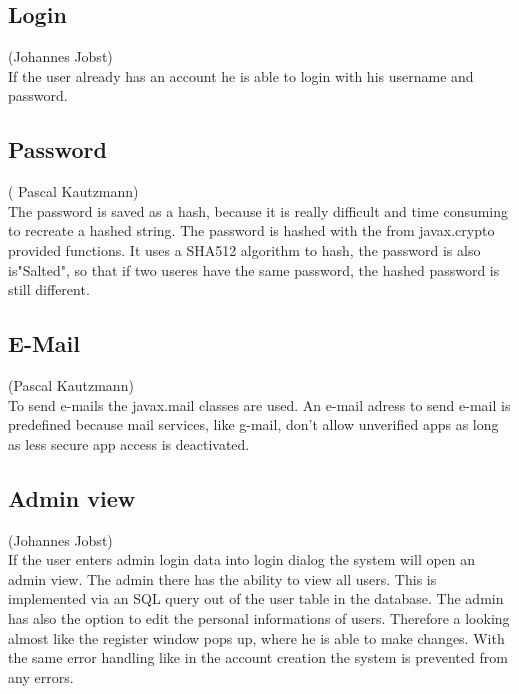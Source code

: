 \documentclass[a4paper, 12pt]{report}
\begin{document}
\subsection{Login}
{\tiny (Johannes Jobst)\\}
If the user already has an account he is able to login with his username and password.

\subsection{Password}
{\tiny ( Pascal Kautzmann)\\}
The password is saved as a hash, because it is really difficult and time consuming to recreate a hashed string.
The password is hashed with the from javax.crypto provided functions. It uses a SHA512 algorithm  to hash, the password is also is"Salted", so that if two useres have the same password, the hashed password is still different.

\subsection{E-Mail}
{\tiny (Pascal Kautzmann)\\}
To send e-mails the javax.mail classes are used. An e-mail adress to send e-mail is predefined %
because mail services, like g-mail, don't allow unverified apps as long as  less secure app access is deactivated. 


\subsection{Admin view}
{\tiny (Johannes Jobst)\\}
If the user enters admin login data into login dialog the system will open an admin view. The admin there has the ability to view all users. This is implemented via an SQL query out of the user table in the database. The admin has also the option to edit the personal informations of users. Therefore a looking almost like the register window pops up, where he is able to make changes.
With the same error handling like in the account creation the system is prevented from any errors.
\end{document}
